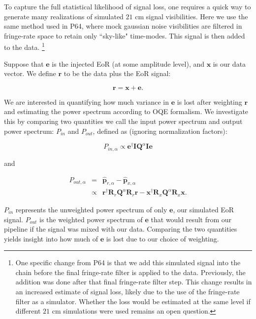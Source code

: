 \documentclass[preprint2,numberedappendix,tighten]{aastex6}  %
\begin{document}
To capture the full statistical likelihood of signal loss, one requires a quick way to generate many realizations of simulated $21$ cm signal visibilities. Here we use the same method used in P64, where mock gaussian noise visibilities are filtered in fringe-rate space to retain only ``sky-like" time-modes. This signal is then added to the data.  \footnote{One specific change from P64 is that we add this simulated signal into the chain before the final fringe-rate filter is applied to the data. Previously, the addition was done after that final fringe-rate filter step.  This change results in an increased estimate of signal loss, likely due to the use of the fringe-rate filter as a simulator. Whether the loss would be estimated at the same level if different $21$ cm simulations were used remains an open question.}

Suppose that $\textbf{e}$ is the injected EoR (at some amplitude level), and $\textbf{x}$ is our data vector. We define $\textbf{r}$ to be the data plus the EoR signal:

\begin{equation}
\textbf{r} = \textbf{x} + \textbf{e}.
\end{equation}

We are interested in quantifying how much variance in $\textbf{e}$ is lost after weighting $\textbf{r}$ and estimating the power spectrum according to OQE formalism. We investigate this by comparing two quantities we call the input power spectrum and output power spectrum: $P_{in}$ and $P_{out}$, defined as (ignoring normalization factors): 

\begin{equation}
\label{eq:Pin}
P_{in,\alpha} \propto \textbf{e}^{\dagger}\textbf{I}\textbf{Q}^{\alpha}\textbf{I}\textbf{e}
\end{equation}

\noindent and

\begin{eqnarray}
\label{eq:sigloss}
P_{out,\alpha} &=& \hat{\textbf{p}}_{r,\alpha}-\hat{\textbf{p}}_{x,\alpha} \nonumber \\
&\propto& \textbf{r}^{\dagger}\textbf{R}_{r}\textbf{Q}^{\alpha}\textbf{R}_{r}\textbf{r} - \textbf{x}^{\dagger}\textbf{R}_{x}\textbf{Q}^{\alpha}\textbf{R}_{x}\textbf{x}.
\end{eqnarray}

$P_{in}$ represents the unweighted power spectrum of only $\textbf{e}$, our simulated EoR signal. $P_{out}$ is the weighted power spectrum of $\textbf{e}$ that would result from our pipeline if the signal was mixed with our data. Comparing the two quantities yields insight into how much of $\textbf{e}$ is lost due to our choice of weighting. 
\end{document}
